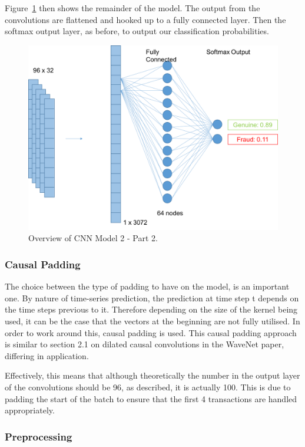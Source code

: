 \documentclass[12pt,a4paper,twoside]{report}
\begin{document}
Figure~\ref{fig:cnnv2-2} then shows the remainder of the model. The output from the convolutions are flattened and hooked up to a fully connected layer. Then the softmax output layer, as before, to output our classification probabilities. 

\begin{figure}[!htbp]
\centering
\includegraphics[scale=0.6]{cnnv2-2}
\caption{Overview of CNN Model 2 - Part 2.}
\label{fig:cnnv2-2}
\end{figure}

\subsubsection{Causal Padding}
The choice between the type of padding to have on the model, is an important one. By nature of time-series prediction, the prediction at time step t depends on the time steps previous to it. Therefore depending on the size of the kernel being used, it can be the case that the vectors at the beginning are not fully utilised. In order to work around this, causal padding is used. This causal padding approach is similar to section 2.1 on dilated causal convolutions in the WaveNet\cite{DBLP:journals/corr/OordDZSVGKSK16} paper, differing in application. 

Effectively, this means that although theoretically the number in the output layer of the convolutions should be 96, as described, it is actually 100. This is due to padding the start of the batch to ensure that the first 4 transactions are handled appropriately. 

\subsubsection{Preprocessing}
\end{document}
